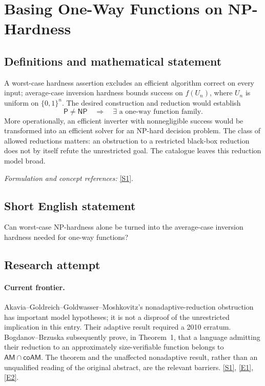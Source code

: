 \documentclass[11pt,a4paper]{article}
\newcommand{\sref}[2]{\hyperlink{source:#1:#2}{[S#2]}}
\newcommand{\eref}[2]{\hyperlink{extra:#1:#2}{[E#2]}}
\newif\ifshowcatalogue
\newcommand{\cataloguescope}[1]{\ifshowcatalogue
 \paragraph{Exact scope in the supplied catalogue.}
 \begin{quote}\small #1\end{quote}\fi}
\numberwithin{equation}{section}
\begin{document}
\setcounter{section}{32}
\clearpage
\section{\texorpdfstring{Basing One-Way Functions on NP-Hardness}{Basing One-Way Functions on NP-Hardness}}\label{33}
\subsection{Definitions and mathematical statement}
A worst-case hardness assertion excludes an efficient algorithm correct on every input; average-case inversion hardness bounds success on $f(U_n)$, where $U_n$ is uniform on $\{0,1\}^n$. The desired construction and reduction would establish
\[
 \mathsf P\ne\mathsf{NP}\quad\Longrightarrow\quad
 \exists\text{ a one-way function family}.
\]
More operationally, an efficient inverter with nonnegligible success would be transformed into an efficient solver for an NP-hard decision problem. The class of allowed reductions matters: an obstruction to a restricted black-box reduction does not by itself refute the unrestricted goal. The catalogue leaves this reduction model broad.
\par\smallskip\textit{Formulation and concept references:} \sref{33}{1}.
\cataloguescope{Determine whether one-way functions can be based on NP-hardness, i.e., whether there is a reduction from a worst-case NP-complete (or NP-hard) decision problem to the task of average-case inverting a polynomial-time computable function, so that P != NP would imply the existence of one-way functions.}
\subsection{Short English statement}
Can worst-case NP-hardness alone be turned into the average-case inversion hardness needed for one-way functions?
\subsection{Research attempt}

\paragraph{Current frontier.}
Akavia--Goldreich--Goldwasser--Moshkovitz's nonadaptive-reduction obstruction
has important model hypotheses; it is not a disproof of the unrestricted
implication in this entry. Their adaptive result required a 2010 erratum.
Bogdanov--Brzuska subsequently prove, in Theorem~1, that a language admitting
their reduction to an approximately size-verifiable function belongs to
$\mathsf{AM}\cap\mathsf{coAM}$. The theorem and the unaffected nonadaptive
result, rather than an unqualified reading of the original abstract, are the
relevant barriers. \sref{33}{1}, \eref{33}{1}, \eref{33}{2}.
\end{document}
